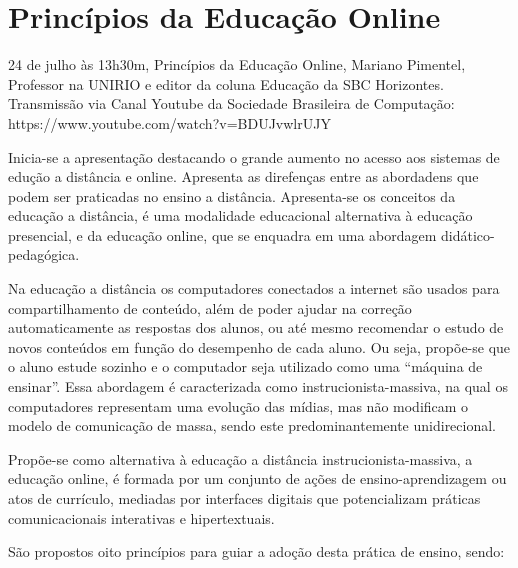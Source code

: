 \section{Princípios da Educação Online}

\begin{center}
  \vspace{1cm}
  24 de julho às 13h30m, Princípios da Educação Online, Mariano Pimentel, Professor na UNIRIO e editor da coluna Educação da SBC Horizontes. Transmissão via Canal Youtube da Sociedade Brasileira de Computação: https://www.youtube.com/watch?v=BDUJvwlrUJY
  \vspace{1cm}
\end{center}

Inicia-se a apresentação destacando o grande aumento no acesso aos sistemas de edução a distância e online. Apresenta as direfenças entre as abordadens que podem ser praticadas no ensino a distância. Apresenta-se os conceitos da educação a distância, é uma modalidade educacional alternativa à educação presencial, e da educação online, que se enquadra em uma abordagem didático-pedagógica.

Na educação a distância os computadores conectados a internet são usados para compartilhamento de conteúdo, além de poder ajudar na correção automaticamente as respostas dos alunos, ou até mesmo recomendar o estudo de novos conteúdos em função do desempenho de cada aluno. Ou seja, propõe-se que o aluno estude sozinho e o computador seja utilizado como uma ``máquina de ensinar''. Essa abordagem é caracterizada como instrucionista-massiva, na qual os computadores representam uma evolução das mídias, mas não modificam o modelo de comunicação de massa, sendo este predominantemente unidirecional.
  
Propõe-se como alternativa à educação a distância instrucionista-massiva, a educação online, é formada por um conjunto de ações de ensino-aprendizagem ou atos de currículo, mediadas por interfaces digitais que potencializam práticas comunicacionais interativas e hipertextuais. 

São propostos oito princípios para guiar a adoção desta prática de ensino, sendo:

